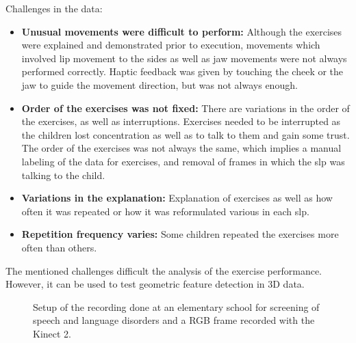 Challenges in the data: 
\begin{itemize}
    \item \textbf{Unusual movements were difficult to perform:} Although the exercises were explained and demonstrated prior to execution, movements which involved lip movement to the sides as well as jaw movements were not always performed correctly. Haptic feedback was given by touching the cheek or the jaw to guide the movement direction, but was not always enough.
    \item \textbf{Order of the exercises was not fixed:} There are variations in the order of the exercises, as well as interruptions. Exercises needed to be interrupted as the children lost concentration as well as to talk to them and gain some trust. The order of the exercises was not always the same, which implies a manual labeling of the data for exercises, and removal of frames in which the \gls{slp} was talking to the child.
    \item \textbf{Variations in the explanation:} Explanation of exercises as well as how often it was repeated or how it was reformulated various in each \gls{slp}. 
    \item \textbf{Repetition frequency varies:} Some children repeated the exercises more often than others.
\end{itemize}
 The mentioned challenges difficult the analysis of the exercise performance. However, it can be used to test geometric feature detection in 3D data. 


\begin{figure}
    \centering
    \hspace{0.5cm}
    \caption{Setup of the recording done at an elementary school for screening of speech and language disorders and a RGB frame recorded with the Kinect 2.}
    \label{fig:setup}
\end{figure}

